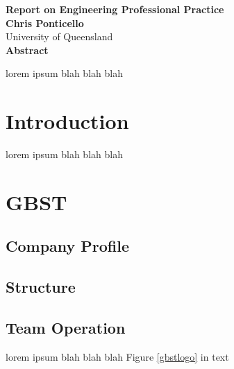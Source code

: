 \documentclass[a4paper]{report}
\begin{document}
\newpage

\begin{center}
	{\Large \bf Report on Engineering Professional Practice} \\
	\vspace{0.4cm}
	{\Large \bf Chris Ponticello} \\
	\vspace{0.4cm}
	{\Large University of Queensland} \\
	\vspace{2.0cm}
	{\Large \bf Abstract} \\
\end{center}

lorem ipsum blah blah blah
%

\tableofcontents

\newpage

\chapter{Introduction}

lorem ipsum blah blah blah


\chapter{GBST}

\section{Company Profile}

\section{Structure}

\section{Team Operation}

lorem ipsum blah blah blah Figure \ref{gbstlogo} in text
\end{document}
